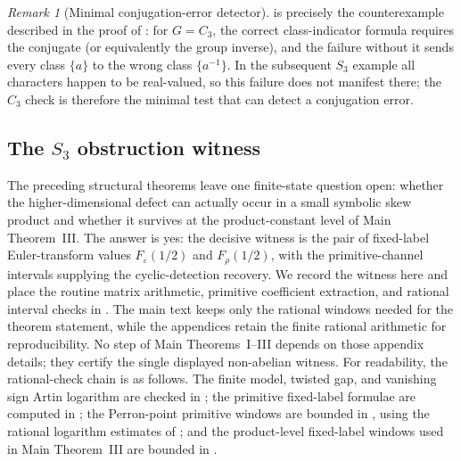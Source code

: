 \documentclass[11pt,a4paper]{amsart}
\theoremstyle{plain}
\theoremstyle{definition}
\theoremstyle{remark}
\newtheorem{remark}[theorem]{Remark}
\begin{document}
\begin{remark}[Minimal conjugation-error detector]
  \label{rem:minimal-conjugation-error-detector}
   is precisely the counterexample
  described in the proof of : for
  \(G=C_3\), the correct class-indicator formula requires the conjugate
  (or equivalently the group inverse), and the failure without it sends
  every class \(\{a\}\) to the wrong class \(\{a^{-1}\}\). In the
  subsequent \(S_3\) example all characters happen to be real-valued,
  so this failure does not manifest there; the \(C_3\) check is therefore
  the minimal test that can detect a conjugation error.
\end{remark}

\subsection{The \texorpdfstring{$S_3$}{S3} obstruction witness}
\label{subsec:s3-obstruction-certificate}

The preceding structural theorems leave one finite-state question open:
whether the higher-dimensional defect can actually occur in a small
symbolic skew product and whether it survives at the product-constant
level of Main Theorem~III.  The answer is yes: the decisive witness is
the pair of fixed-label Euler-transform values
\(F_\varepsilon(1/2)\) and \(F_\rho(1/2)\), with the primitive-channel
intervals supplying the cyclic-detection recovery.  We record the witness
here and place the routine matrix arithmetic, primitive coefficient
extraction, and rational interval checks in
.
The main text keeps only the rational windows needed for the theorem
statement, while the appendices retain the finite rational arithmetic for
reproducibility.  No step of Main Theorems~I--III depends on those appendix
details; they certify the single displayed non-abelian witness.  For
readability, the rational-check chain is as follows.  The finite model,
twisted gap, and vanishing sign Artin logarithm are checked in
; the primitive fixed-label formulae are
computed in ; the Perron-point
primitive windows are bounded in ,
using the rational logarithm estimates of
; and the product-level
fixed-label windows used in Main Theorem~III are bounded in
.
\end{document}
